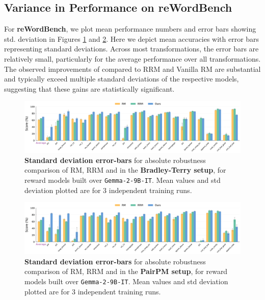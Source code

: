 \subsection{Variance in Performance on reWordBench}
\label{ssec:variance_rewordbench}

For \textbf{reWordBench}, we plot mean performance numbers and error bars showing std. deviation in Figures \ref{fig:reword_absolute_robustness_gemma2b_pairpm_stddev} and \ref{fig:reword_absolute_robustness_gemma2b_bt_stddev}.
Here we  depict mean accuracies with error bars representing standard deviations. Across most transformations, the error bars are relatively small, particularly for the average performance over all transformations. The observed improvements of \carma{} compared to RRM and Vanilla RM are substantial and typically exceed multiple standard deviations of the respective models, suggesting that these gains are statistically significant.

\begin{figure}[!ht]
  \centering
  \includegraphics[width=0.9\columnwidth]{images/reword_absolute_robustness_gemma9b_bt_sorted_mean_std_no_diff_annot.pdf}
  \caption{\textbf{Standard deviation error-bars} for absolute robustness comparison of RM, RRM and \carma{} in the \textbf{Bradley-Terry setup}, for reward models built over \texttt{Gemma-2-9B-IT}. Mean values and std deviation plotted are for 3 independent training runs.}
  \label{fig:reword_absolute_robustness_gemma2b_pairpm_stddev}
\end{figure}


\begin{figure}[!ht]
  \centering
  \includegraphics[width=0.9\columnwidth]{images/reword_absolute_robustness_gemma9b_pairpm_sorted_mean_std_no_diff_annot.pdf}
  \caption{\textbf{Standard deviation error-bars} for absolute robustness comparison of RM, RRM and \carma{} in the \textbf{PairPM setup}, for reward models built over \texttt{Gemma-2-9B-IT}. Mean values and std deviation plotted are for 3 independent training runs.}
  \label{fig:reword_absolute_robustness_gemma2b_bt_stddev}
\end{figure}

